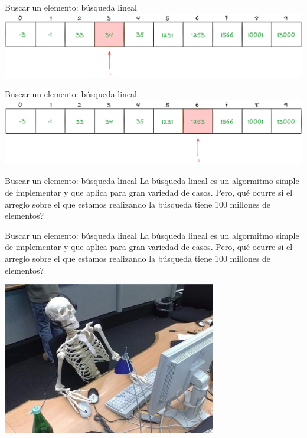 \documentclass[12pt]{beamer}
\begin{document}
\begin{frame}{Buscar un elemento: búsqueda lineal}
    \includegraphics[width=\textwidth]{busqueda_lineal_4.png}
\end{frame}

\begin{frame}{Buscar un elemento: búsqueda lineal}
    \includegraphics[width=\textwidth]{busqueda_lineal_final.png}
\end{frame}

\begin{frame}{Buscar un elemento: búsqueda lineal}
    La \alert{búsqueda lineal} es un algormitmo simple de implementar y que aplica para gran variedad de casos. Pero, qué ocurre si el arreglo sobre el que estamos realizando la búsqueda tiene 100 millones de elementos?
\end{frame}

\begin{frame}{Buscar un elemento: búsqueda lineal}
    La \alert{búsqueda lineal} es un algormitmo simple de implementar y que aplica para gran variedad de casos. Pero, qué ocurre si el arreglo sobre el que estamos realizando la búsqueda tiene 100 millones de elementos?
    
    \medskip

    \begin{center}
        \includegraphics[width=0.7\textwidth]{skeleton_meme.jpg}
    \end{center}
\end{frame}
\end{document}
